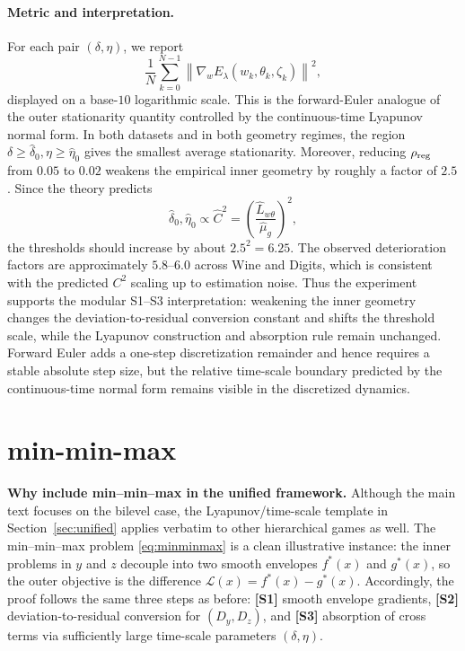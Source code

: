 \documentclass{article}
\newcommand{\1}{\mathbf{1}}
\begin{document}
\paragraph{Metric and interpretation.}
For each pair $(\delta,\eta)$, we report
\[
\frac1N\sum_{k=0}^{N-1}
\left\|
\nabla_w E_\lambda(w_k,\theta_k,\zeta_k)
\right\|^2,
\]
displayed on a base-$10$ logarithmic scale. This is the forward-Euler analogue
of the outer stationarity quantity controlled by the continuous-time Lyapunov
normal form. In both datasets and in both geometry regimes, the region
$\delta\ge\widehat\delta_0,\eta\ge\widehat\eta_0$ gives the smallest average
stationarity. Moreover, reducing $\rho_{\rm reg}$ from $0.05$ to $0.02$ weakens
the empirical inner geometry by roughly a factor of $2.5$. Since the theory
predicts
\[
\widehat\delta_0,\widehat\eta_0 \propto \widehat C^2
=
\left(\frac{\widehat L_{w\theta}}{\widehat\mu_g}\right)^2,
\]
the thresholds should increase by about $2.5^2=6.25$. The observed
deterioration factors are approximately $5.8$--$6.0$ across Wine and Digits,
which is consistent with the predicted $C^2$ scaling up to estimation noise.
Thus the experiment supports the modular S1--S3 interpretation: weakening the
inner geometry changes the deviation-to-residual conversion constant and shifts
the threshold scale, while the Lyapunov construction and absorption rule remain
unchanged. Forward Euler adds a one-step discretization remainder and hence
requires a stable absolute step size, but the relative time-scale boundary
predicted by the continuous-time normal form remains visible in the discretized
dynamics.

\section{min-min-max}\label{sec:minminmax}
\noindent\textbf{Why include min--min--max in the unified framework.}
\noindent
Although the main text focuses on the bilevel case, the Lyapunov/time-scale template in
Section~\ref{sec:unified} applies verbatim to other hierarchical games as well.
The min--min--max problem \eqref{eq:minminmax} is a clean illustrative instance:
the inner problems in $y$ and $z$ decouple into two smooth envelopes $f^*(x)$ and $g^*(x)$,
so the outer objective is the difference $\mathcal L(x)=f^*(x)-g^*(x)$.
Accordingly, the proof follows the same three steps as before:
\textbf{[S1]} smooth envelope gradients,
\textbf{[S2]} deviation-to-residual conversion for $(D_y,D_z)$,
and \textbf{[S3]} absorption of cross terms via sufficiently large time-scale parameters $(\delta,\eta)$.
\end{document}
